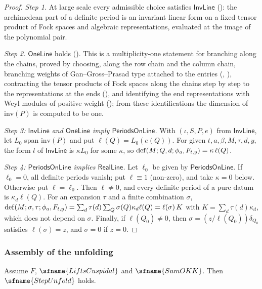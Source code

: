 \begin{proof}
\emph{Step 1.} At large scale every admissible choice satisfies $\mathsf{InvLine}$
(): the archimedean part of a definite period is an invariant linear form on a
fixed tensor product of Fock spaces and algebraic representations, evaluated at the image of the polynomial pair.

\emph{Step 2.} $\mathsf{OneLine}$ holds (). This is a multiplicity-one statement
for branching along the chains, proved by choosing, along the row chain and the column chain, branching weights of
Gan--Gross--Prasad type attached to the entries
(, ), contracting
the tensor products of Fock spaces along the chains step by step to the representations at the ends
(), and identifying the end representations with Weyl modules of
positive weight (); from these identifications the dimension of
$\mathrm{inv}(P)$ is computed to be one.

\emph{Step 3: $\mathsf{InvLine}$ and $\mathsf{OneLine}$ imply $\mathsf{PeriodsOnLine}$.} With $(\iota,S,P,e)$ from $\mathsf{InvLine}$,
let $L_0$ span $\mathrm{inv}(P)$ and put $\ell(Q)=L_0(e(Q))$. For given $t,a,\beta,M,\tau,d,y$, the form $l$ of $\mathsf{InvLine}$
is $\kappa L_0$ for some $\kappa$, so $\mathrm{def}(M;Q,d;\phi_a,F_{t,y})=\kappa\,\ell(Q)$.

\emph{Step 4: $\mathsf{PeriodsOnLine}$ implies $\mathsf{RealLine}$.} Let $\ell_0$ be given by $\mathsf{PeriodsOnLine}$. If $\ell_0=0$,
all definite periods vanish; put $\ell\equiv1$ (non-zero), and take $\kappa=0$ below. Otherwise put $\ell=\ell_0$. Then
$\ell\ne0$, and every definite period of a pure datum is $\kappa_d\ell(Q)$. For an expansion $\tau$ and a finite combination
$\sigma$, $\mathrm{def}(M;\sigma,\tau;\phi_a,F_{t,y})=\sum_d\tau(d)\sum_Q\sigma(Q)\kappa_d\ell(Q)=\ell(\sigma)\,K$ with
$K=\sum_d\tau(d)\kappa_d$, which does not depend on $\sigma$. Finally, if $\ell(Q_0)\ne0$, then $\sigma=(z/\ell(Q_0))\delta_{Q_0}$
satisfies $\ell(\sigma)=z$, and $\sigma=0$ if $z=0$.
\end{proof}

\subsubsection{Assembly of the unfolding}
\begin{proposition}[Unfolding]\label{pf:rowprops:unfoldmain}
Assume $F$, $\sfname{LiftsCuspidal}$ and $\sfname{SumOKK}$. Then $\sfname{StepUnfold}$ holds.
\end{proposition}

